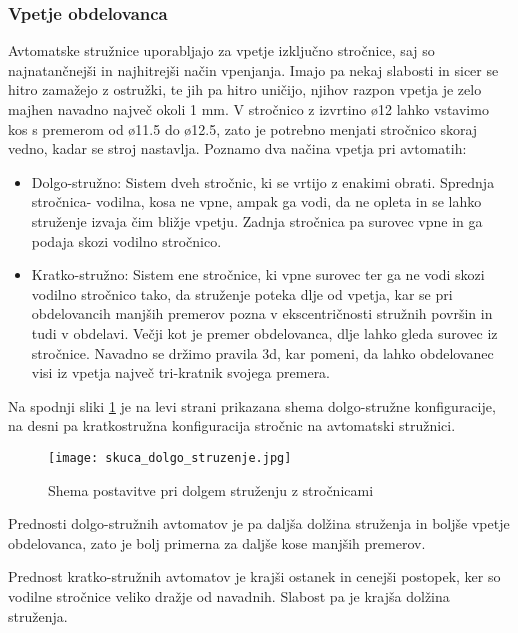 \subsubsection{Vpetje obdelovanca}
Avtomatske stružnice uporabljajo za vpetje izključno stročnice,
saj so najnatančnejši in najhitrejši način vpenjanja. Imajo pa nekaj slabosti
in sicer se hitro zamažejo z ostružki, te jih pa hitro uničijo,
njihov razpon vpetja je zelo majhen navadno največ okoli 1 mm. V stročnico z
izvrtino ø12 lahko vstavimo kos s premerom od ø11.5 do ø12.5,
zato je potrebno menjati stročnico skoraj vedno, kadar se stroj nastavlja.
Poznamo dva načina vpetja pri avtomatih:
\begin{itemize}
	\item Dolgo-stružno: Sistem dveh stročnic, ki se vrtijo z
	      enakimi obrati. Sprednja stročnica- vodilna, kosa ne vpne,
	      ampak ga vodi, da ne opleta in se lahko struženje izvaja čim
	      bližje vpetju. Zadnja stročnica pa surovec vpne in ga podaja
	      skozi vodilno stročnico.
	\item Kratko-stružno: Sistem ene stročnice, ki vpne surovec
	      ter ga ne vodi skozi vodilno stročnico tako, da struženje
	      poteka dlje od vpetja, kar se pri obdelovancih manjših
	      premerov pozna v ekscentričnosti stružnih površin in tudi v obdelavi.
	      Večji kot je premer obdelovanca, dlje lahko gleda surovec iz stročnice.
	      Navadno se držimo pravila 3d, kar pomeni, da lahko obdelovanec visi
	      iz vpetja največ tri-kratnik svojega premera.
\end{itemize}

Na spodnji sliki \ref{tipi_vodilnih_pus} je na levi strani prikazana
shema dolgo-stružne konfiguracije, na desni pa kratkostružna konfiguracija
stročnic na avtomatski stružnici.

\begin{figure}[H]
	\begin{center}
		\texttt{[image: skuca\_dolgo\_struzenje.jpg]}
		\caption{Shema postavitve pri dolgem struženju z stročnicami
			\cite{interna}}
		\label{tipi_vodilnih_pus}
	\end{center}
\end{figure}

Prednosti dolgo-stružnih avtomatov je pa daljša dolžina struženja
in boljše vpetje obdelovanca, zato je bolj primerna za daljše
kose manjših premerov.

Prednost kratko-stružnih avtomatov je krajši ostanek in cenejši
postopek, ker so vodilne stročnice veliko dražje od navadnih.
Slabost pa je krajša dolžina struženja.


